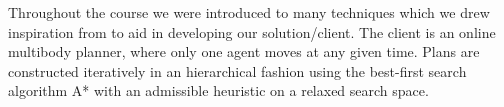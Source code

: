 Throughout the course we were introduced to many techniques which we drew inspiration from to aid in developing our solution/client.
The client is an online multibody planner, where only one agent moves at any given time.
Plans are constructed iteratively in an hierarchical fashion using the best-first search algorithm A* with an admissible heuristic on a relaxed search space.~\cite{russell2009modern,geffner2013concise} 
